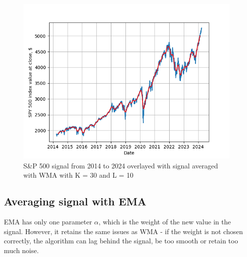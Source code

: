 \documentclass[a4paper,12pt,fleqn]{article}
\begin{document}
                \begin{figure}[ht]
                    \centering
                    \includegraphics[width=1\textwidth]{images/WMA_ex_3.png} %
                    \caption{S\&P 500 signal from 2014 to 2024 overlayed with signal averaged with WMA with K = 30 and L = 10}
                    \label{fig:WMA_ex_3}
                \end{figure}
\newpage
                \subsection{Averaging signal with EMA}

                \hspace{1 em} EMA has only one parameter \begin{math}
                    \alpha
                \end{math}, which is the weight of the new value in the signal. However, it retains the same
                issues as WMA - if the weight is not chosen correctly, the algorithm can lag behind the signal, be too smooth or retain too much noise.
\end{document}
